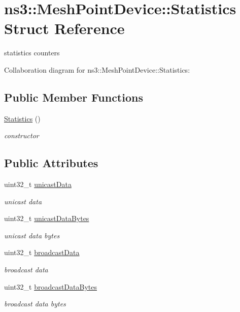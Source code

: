\hypertarget{structns3_1_1MeshPointDevice_1_1Statistics}{}\section{ns3\+:\+:Mesh\+Point\+Device\+:\+:Statistics Struct Reference}
\label{structns3_1_1MeshPointDevice_1_1Statistics}


statistics counters  




Collaboration diagram for ns3\+:\+:Mesh\+Point\+Device\+:\+:Statistics\+:
\subsection*{Public Member Functions}
\begin{DoxyCompactItemize}
\item 
\hyperlink{structns3_1_1MeshPointDevice_1_1Statistics_a4abbd34c10dbb395e06b5e5739b084f7}{Statistics} ()
\begin{DoxyCompactList}\small\item\em constructor \end{DoxyCompactList}\end{DoxyCompactItemize}
\subsection*{Public Attributes}
\begin{DoxyCompactItemize}
\item 
uint32\+\_\+t \hyperlink{structns3_1_1MeshPointDevice_1_1Statistics_a756dc2e1a805c69edad8e6cf70dcc821}{unicast\+Data}
\begin{DoxyCompactList}\small\item\em unicast data \end{DoxyCompactList}\item 
uint32\+\_\+t \hyperlink{structns3_1_1MeshPointDevice_1_1Statistics_aac39836264b8ec7bf45143814b21aef8}{unicast\+Data\+Bytes}
\begin{DoxyCompactList}\small\item\em unicast data bytes \end{DoxyCompactList}\item 
uint32\+\_\+t \hyperlink{structns3_1_1MeshPointDevice_1_1Statistics_a63f262171b72e2841c8d8020962aebbe}{broadcast\+Data}
\begin{DoxyCompactList}\small\item\em broadcast data \end{DoxyCompactList}\item 
uint32\+\_\+t \hyperlink{structns3_1_1MeshPointDevice_1_1Statistics_ae43272e72d10a3ff03be29fb86ed1969}{broadcast\+Data\+Bytes}
\begin{DoxyCompactList}\small\item\em broadcast data bytes \end{DoxyCompactList}\end{DoxyCompactItemize}


